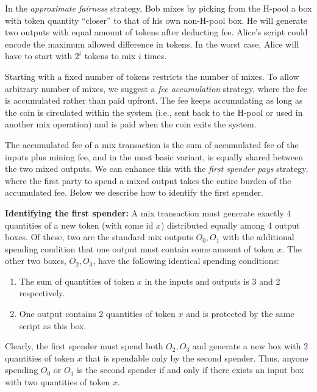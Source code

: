 \documentclass[11pt]{article}
\begin{document}
 In the {\em approximate fairness} strategy, Bob mixes by picking from the H-pool a box with token quantity ``closer'' to that of his own non-H-pool box. He will generate two outputs with equal amount of tokens after deducting fee. Alice's script could encode the maximum allowed difference in tokens. In the worst case, Alice will have to start with $2^i$ tokens to mix $i$ times.
 
 Starting with a fixed number of tokens restricts the number of mixes. To allow arbitrary number of mixes, we suggest a {\em fee accumulation} strategy, where the fee is accumulated rather than paid upfront. %
The fee keeps accumulating as long as the coin is circulated within the system (i.e., sent back to the H-pool or used in another mix operation) and is paid when the coin exits the system.

 The accumulated fee of a mix transaction is the sum of accumulated fee of the inputs plus mining fee, and in the most basic variant, is equally shared between the two mixed outputs.
 We can enhance this with the {\em first spender pays} strategy, where the first party to spend a mixed output takes the entire burden of the accumulated fee. 
 Below we describe how to identify the first spender.
 
 \textbf{Identifying the first spender:} A mix transaction must generate exactly 4 quantities of a new token (with some id $x$) distributed equally among 4 output boxes. Of these, two are the standard mix outputs $O_0, O_1$ with the additional spending condition that one output must contain some amount of token $x$. The other two boxes, $O_2, O_3$, have the following identical spending conditions:
		\begin{enumerate}
			\item The sum of quantities of token $x$ in the inputs and outputs is 3 and 2 respectively.
			\item One output contains 2 quantities of token $x$ and is protected by the same script as this box. 
		\end{enumerate}
	
Clearly, the first spender must spend both $O_2, O_3$ and generate a new box with 2 quantities of token $x$ that is spendable only by the second spender. 
Thus, anyone spending $O_0$ or $O_1$ is the second spender if and only if there exists an input box with two quantities of token $x$. 




\end{document}

